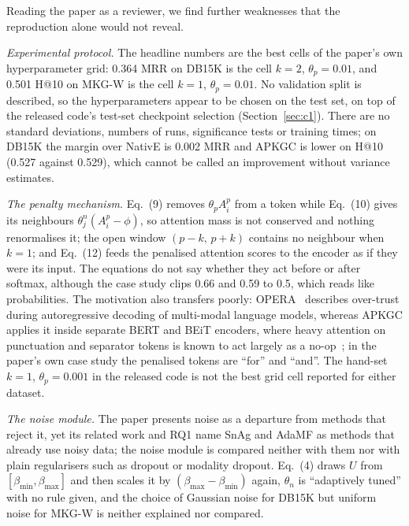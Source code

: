 \documentclass[conference,a4paper]{IEEEtran}
\begin{document}
Reading the paper as a reviewer, we find further weaknesses that the reproduction alone
would not reveal.

\emph{Experimental protocol.} The headline numbers are the best cells of the paper's own
hyperparameter grid: 0.364 MRR on DB15K is the cell $k=2$, $\theta_p=0.01$, and 0.501 H@10
on MKG-W is the cell $k=1$, $\theta_p=0.01$. No validation split is described, so the
hyperparameters appear to be chosen on the test set, on top of the released code's
test-set checkpoint selection (Section~\ref{sec:c1}). There are no standard deviations,
numbers of runs, significance tests or training times; on DB15K the margin over NativE is
0.002 MRR and APKGC is lower on H@10 (0.527 against 0.529), which cannot be called an
improvement without variance estimates.

\emph{The penalty mechanism.} Eq.~(9) removes $\theta_p A^p_i$ from a token while Eq.~(10)
gives its neighbours $\theta^n_j(A^p_i-\phi)$, so attention mass is not conserved and
nothing renormalises it; the open window $(p-k,\,p+k)$ contains no neighbour when $k=1$;
and Eq.~(12) feeds the penalised attention scores to the encoder as if they were its input.
The equations do not say whether they act before or after softmax, although the case study
clips 0.66 and 0.59 to 0.5, which reads like probabilities. The motivation also transfers
poorly: OPERA~\cite{opera} describes over-trust during autoregressive decoding of
multi-modal language models, whereas APKGC applies it inside separate BERT and BEiT
encoders, where heavy attention on punctuation and separator tokens is known to act largely
as a no-op~\cite{clark}; in the paper's own case study the penalised tokens are ``for'' and
``and''. The hand-set $k=1$, $\theta_p=0.001$ in the released code is not the best grid cell
reported for either dataset.

\emph{The noise module.} The paper presents noise as a departure from methods that reject
it, yet its related work and RQ1 name SnAg and AdaMF as methods that already use noisy data;
the noise module is compared neither with them nor with plain regularisers such as dropout
or modality dropout. Eq.~(4) draws $U$ from $[\beta_{\min},\beta_{\max}]$ and then scales
it by $(\beta_{\max}-\beta_{\min})$ again, $\theta_n$ is ``adaptively tuned'' with no rule
given, and the choice of Gaussian noise for DB15K but uniform noise for MKG-W is neither
explained nor compared.
\end{document}
